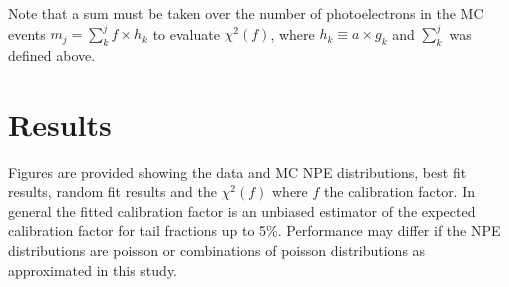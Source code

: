 \documentclass[12pt]{article}
\begin{document}
Note that a sum must be taken over the number of photoelectrons in the MC events  $m_j  = \sum_k^j f\times h_k$ to evaluate $\chi^2(f)$, 
where $h_k \equiv a\times g_k$ and $\sum_k^j$ was defined above.



\clearpage
\section{Results}
Figures are provided showing the data and MC NPE distributions, best fit results, random fit results and the $\chi^2(f)$ where $f$ the calibration factor.
In general the fitted calibration factor is an unbiased estimator of the expected calibration factor for tail fractions up to 5\%. 
Performance may differ if the NPE distributions are poisson or combinations of poisson distributions as approximated in this study.



\clearpage


\end{document}
